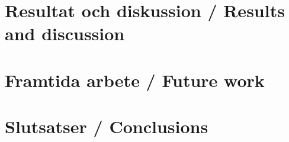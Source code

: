 \documentclass[a4paper,12pt]{article}
\begin{document}
\section{Resultat och diskussion / Results and discussion}
\label{sec:resultat}

\section{Framtida arbete / Future work}
\label{sec:framtida}

\section{Slutsatser / Conclusions}
\label{sec:slutsatser}


%



%

\newpage
\appendix %


\makeatletter
\renewenvironment{theindex}
               {\if@twocolumn
                  \@restonecolfalse
                \else
                  \@restonecoltrue
                \fi
                \twocolumn[\section{\indexname}]%
                \@mkboth{\MakeUppercase\indexname}%
                        {\MakeUppercase\indexname}%
                \thispagestyle{plain}\parindent\z@
                \parskip\z@ \@plus .3\p@\relax
                \columnseprule \z@
                \columnsep 35\p@
                \let\item\@idxitem}
               {\if@restonecol\onecolumn\else\clearpage\fi}
\makeatother
\printindex
\end{document}
